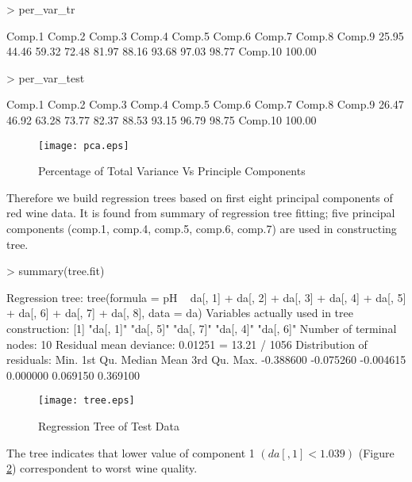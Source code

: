 \documentclass[12pt]{article}
\begin{document}
\begin{Schunk}
\begin{Sinput}
> per_var_tr
\end{Sinput}
\begin{Soutput}
 Comp.1  Comp.2  Comp.3  Comp.4  Comp.5  Comp.6  Comp.7  Comp.8  Comp.9
  25.95   44.46   59.32   72.48   81.97   88.16   93.68   97.03   98.77
Comp.10
 100.00
\end{Soutput}
\begin{Sinput}
> per_var_test
\end{Sinput}
\begin{Soutput}
 Comp.1  Comp.2  Comp.3  Comp.4  Comp.5  Comp.6  Comp.7  Comp.8  Comp.9
  26.47   46.92   63.28   73.77   82.37   88.53   93.15   96.79   98.75
Comp.10
 100.00
\end{Soutput}
\end{Schunk}


 \begin{figure} [htbp]
 \begin{center}
\texttt{[image: pca.eps]}
\caption{Percentage of Total Variance Vs Principle Components}
 \label{fig:pca}
\end{center}
\end{figure}

Therefore we build regression trees based on first eight principal components of red wine data. It is found from
summary of regression tree fitting; five principal components (comp.1, comp.4, comp.5, comp.6, comp.7) are used
in constructing tree.

\begin{Schunk}
\begin{Sinput}
> summary(tree.fit)
\end{Sinput}
\begin{Soutput}
Regression tree:
tree(formula = pH ~ da[, 1] + da[, 2] + da[, 3] + da[, 4] + da[,
    5] + da[, 6] + da[, 7] + da[, 8], data = da)
Variables actually used in tree construction:
[1] "da[, 1]" "da[, 5]" "da[, 7]" "da[, 4]" "da[, 6]"
Number of terminal nodes:  10
Residual mean deviance:  0.01251 = 13.21 / 1056
Distribution of residuals:
     Min.   1st Qu.    Median      Mean   3rd Qu.      Max.
-0.388600 -0.075260 -0.004615  0.000000  0.069150  0.369100
\end{Soutput}
\end{Schunk}

\begin{figure} [htbp]
 \begin{center}
\texttt{[image: tree.eps]}
\caption{Regression Tree of Test Data}
 \label{fig:tree}
\end{center}
\end{figure}
The tree indicates that lower value of component 1 $(da[,1]<1.039)$ (Figure \ref{fig:tree}) correspondent to worst wine quality.
\end{document}
